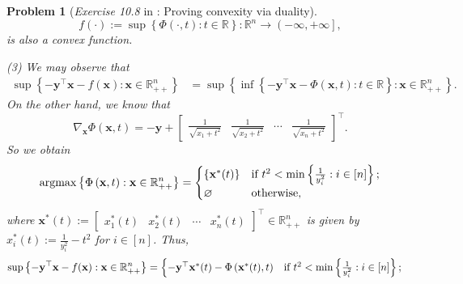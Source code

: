 \documentclass[11pt]{article}
\newtheorem{problem}{Problem}
\DeclareMathOperator*{\argmax}{argmax}
\numberwithin{equation}{problem}
\begin{document}
\begin{problem} [\emph{Exercise 10.8} in \cite{calafiore2014optimization}: Proving convexity via duality]
{\begin{equation*}
    f(\cdot) := \sup \left\{ \Phi \left( \cdot, t \right) : t \in \mathbb{R} \right\} : \mathbb{R}^n \rightarrow \left( -\infty, +\infty \right],
\end{equation*}
is also a convex function. 
\medskip

\indent (3) We may observe that
\begin{equation}
    \label{eqn3.4}
    \begin{split}
        \sup \left\{ - \mathbf{y}^{\top} \mathbf{x} - f(\mathbf{x}) : \mathbf{x} \in \mathbb{R}_{++}^n \right\}
        &= \sup \left\{ \inf \left\{ - \mathbf{y}^{\top} \mathbf{x} - \Phi \left( \mathbf{x}, t \right) : t \in \mathbb{R} \right\} : \mathbf{x} \in \mathbb{R}_{++}^n \right\}.
    \end{split}
\end{equation}
On the other hand, we know that
\begin{equation*}
    \nabla_{\mathbf{x}} \Phi \left( \mathbf{x}, t \right) = - \mathbf{y} + 
    \begin{bmatrix}
        \frac{1}{\sqrt{x_1 + t^2}} & \frac{1}{\sqrt{x_2 + t^2}} & \cdots &
        \frac{1}{\sqrt{x_n + t^2}}
    \end{bmatrix}^{\top}.
\end{equation*}
So we obtain
\begin{equation*}
    \argmax \left\{ \Phi \left( \mathbf{x}, t \right) : \mathbf{x} \in \mathbb{R}_{++}^n \right\}
    = 
    \begin{cases}
        \left\{ \mathbf{x}^* (t) \right\} & \textnormal{if } t^2 < \min \left\{ \frac{1}{y_{i}^2} : i \in [n] \right\}; \\
        \varnothing & \textnormal{otherwise,}
    \end{cases}
\end{equation*}
where $\mathbf{x}^* (t) := \begin{bmatrix} x_{1}^* (t) & x_{2}^* (t) & \cdots & x_{n}^* (t) \end{bmatrix}^{\top} \in \mathbb{R}_{++}^n$ is given by $x_{i}^* (t) := \frac{1}{y_{i}^2} - t^2$ for $i \in [n]$. Thus,
\begin{equation*}
    \begin{split}
        \sup \left\{ - \mathbf{y}^{\top} \mathbf{x} - f(\mathbf{x}) : \mathbf{x} \in \mathbb{R}_{++}^n \right\} &= 
        \begin{cases}
            - \mathbf{y}^{\top} \mathbf{x}^* (t) - \Phi \left( \mathbf{x}^* (t), t \right) & \textnormal{if } t^2 < \min \left\{ \frac{1}{y_{i}^2} : i \in [n] \right\}; \\

\end{cases}
\end{split}
\end{equation*}}
\end{problem}
\end{document}
